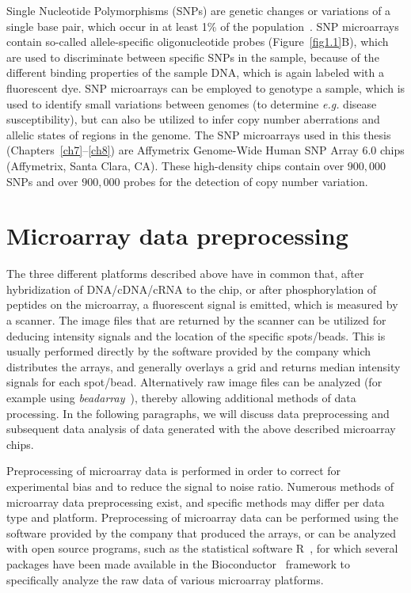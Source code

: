 Single Nucleotide Polymorphisms (SNPs) are genetic changes or variations of a single base pair, which occur in at least 1\% of the population~\cite{gibbs2003international}. SNP microarrays contain so-called allele\hyp{}specific oligonucleotide probes (Figure~\ref{fig1.1}B), which are used to discriminate between specific SNPs in the sample, because of the different binding properties of the sample DNA, which is again labeled with a fluorescent dye. SNP microarrays can be employed to genotype a sample, which is used to identify small variations between genomes (to determine {\it e.g.} disease susceptibility), but can also be utilized to infer copy number aberrations and allelic states of regions in the genome. The SNP microarrays used in this thesis (Chapters~\ref{ch7}--\ref{ch8}) are Affymetrix Genome\hyp{}Wide Human SNP Array 6.0  chips (Affymetrix, Santa Clara, CA). These high\hyp{}density chips contain over $900,000$ SNPs and over $900,000$ probes for the detection of copy number variation.

%
\section{Microarray data preprocessing}\label{preprocessing1}
The three different platforms described above have in common that, after hybridization of DNA/cDNA/cRNA to the chip, or after phosphorylation of peptides on the microarray, a fluorescent signal is emitted, which is measured by a scanner. The image files that are returned by the scanner can be utilized for deducing intensity signals and the location of the specific spots/beads. This is usually performed directly by the software provided by the company which distributes the arrays, and generally overlays a grid and returns median intensity signals for each spot/bead. Alternatively raw image files can be analyzed (for example using {\it beadarray}~\cite{dunning2007beadarray}), thereby allowing additional methods of data processing. In the following paragraphs, we will discuss data preprocessing and subsequent data analysis of data generated with the above described microarray chips.

Preprocessing of microarray data is performed in order to correct for experimental bias and to reduce the signal to noise ratio. Numerous methods of microarray data preprocessing exist, and specific methods may differ per data type and platform. Preprocessing of microarray data can be performed using the software provided by the company that produced the arrays, or can be analyzed with open source programs, such as the statistical software R~\cite{r2.15.0}, for which several packages have been made available in the Bioconductor~\cite{gentleman2004bioconductor} framework to specifically analyze the raw data of various microarray platforms.

